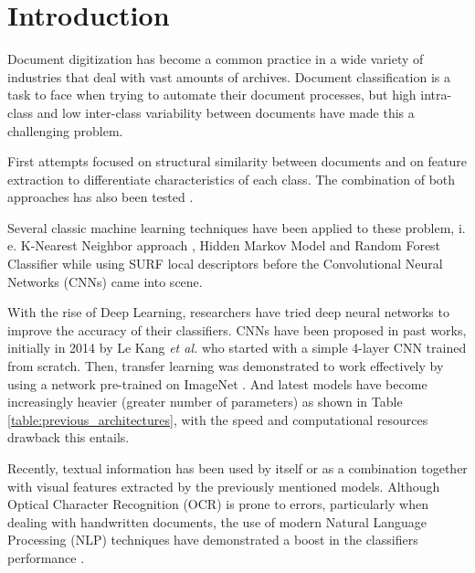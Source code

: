 \documentclass[runningheads]{llncs}
\begin{document}
\section{Introduction} \label{sect:introduction}

Document digitization has become a common practice in a wide variety of industries that deal with vast amounts of archives. Document classification is a task to face when trying to automate their document processes, but high intra-class and low inter-class variability between documents have made this a challenging problem.

First attempts focused on structural similarity between documents \cite{layout_structural_similiarity} and on feature extraction \cite{tobacco3482,local_salient,doc_structure} to differentiate characteristics of each class. The combination of both approaches has also been tested \cite{clustering_separation}.

Several classic machine learning techniques have been applied to these problem, i. e. K-Nearest Neighbor approach \cite{nearest_neighbor}, Hidden Markov Model \cite{markov} and Random Forest Classifier \cite{unsupervised,tobacco3482} while using SURF local descriptors before the Convolutional Neural Networks (CNNs) came into scene.

With the rise of Deep Learning, researchers have tried deep neural networks to improve the accuracy of their classifiers. CNNs have been proposed in past works, initially in 2014 by Le Kang \textit{et al.} \cite{tobacco3482_v2} who started with a simple 4-layer CNN trained from scratch. Then, transfer learning was demonstrated to work effectively \cite{BigTobacco,deepdoc} by using a network pre-trained on ImageNet \cite{Imagenet}. And latest models have become increasingly heavier (greater number of parameters) \cite{CNNs_analysis,intra_domain,cutting_error} as shown in Table \ref{table:previous_architectures}, with the speed and computational resources drawback this entails.

Recently, textual information has been used by itself or as a combination together with visual features extracted by the previously mentioned models. Although Optical Character Recognition (OCR) is prone to errors, particularly when dealing with handwritten documents, the use of modern Natural Language Processing (NLP) techniques have demonstrated a boost in the classifiers performance \cite{noce,multimodal,stream}.
\end{document}
